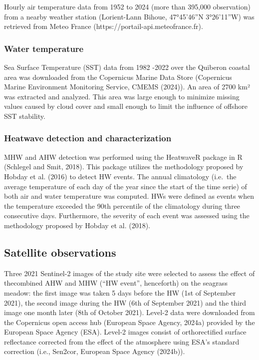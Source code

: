 \documentclass[
  letterpaper,
  DIV=11,
  numbers=noendperiod]{scrartcl}
\begin{document}
Hourly air temperature data from 1952 to 2024 (more than 395,000
observation) from a nearby weather station (Lorient-Lann Bihoue,
47°45'46''N 3°26'11''W) was retrieved from Meteo France
(https://portail-api.meteofrance.fr).

\subsubsection{Water temperature}\label{water-temperature}

Sea Surface Temperature (SST) data from 1982 -2022 over the Quiberon
coastal area was downloaded from the Copernicus Marine Data Store
(Copernicus Marine Environment Monitoring Service, CMEMS (2024)). An
area of 2700 km² was extracted and analyzed. This area was large enough
to minimize missing values caused by cloud cover and small enough to
limit the influence of offshore SST stability.

\subsubsection{Heatwave detection and
characterization}\label{heatwave-detection-and-characterization}

MHW and AHW detection was performed using the HeatwaveR package in R
(Schlegel and Smit, 2018). This package utilizes the methodology
proposed by Hobday et al. (2016) to detect HW events. The annual
climatology (i.e.~the average temperature of each day of the year since
the start of the time serie) of both air and water temperature was
computed. HWs were defined as events when the temperature exceeded the
90th percentile of the climatology during three consecutive days.
Furthermore, the severity of each event was assessed using the
methodology proposed by Hobday et al. (2018).

\subsection{Satellite observations}\label{satellite-observations}

Three 2021 Sentinel-2 images of the study site were selected to assess
the effect of thecombined AHW and MHW (``HW event'', henceforth) on the
seagrass meadow: the first image was taken 5 days before the HW (1st of
September 2021), the second image during the HW (6th of September 2021)
and the third image one month later (8th of October 2021). Level-2 data
were downloaded from the Copernicus open access hub (European Space
Agency, 2024a) provided by the European Space Agency (ESA). Level-2
images consist of orthorectified surface reflectance corrected from the
effect of the atmosphere using ESA's standard correction (i.e., Sen2cor,
European Space Agency (2024b)).
\end{document}
